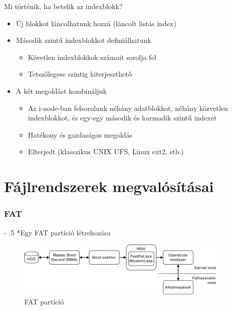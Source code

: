 \documentclass[tikz,12pt,margin=0px]{article}
\makeatletter
\renewcommand\paragraph{%
	\@startsection{paragraph}{4}{0mm}%
	{-\baselineskip}%
	{.5\baselineskip}%
	{\normalfont\normalsize\bfseries}}
\makeatother
\begin{document}
    \noindent Mi történik, ha betelik az indexblokk?
    \begin{itemize}[topsep=8pt,itemsep=4pt,partopsep=4pt, parsep=4pt]
      \item Új blokkot láncolhatunk hozzá (láncolt listás index)
      \item Második szintű indexblokkot definiálhatunk
      \begin{itemize}
        \item Követlen indexblokkok számait sorolja fel
        \item Tetszőlegese szintig kiterjeszthető
      \end{itemize}
      \item A két megoldást kombináljuk
      \begin{itemize}
        \item Az i-node-ban felsorolunk néhány adatblokkot, néhány közvetlen indexblokkot, és egy-egy második és harmadik szintű indexet
        \item Hatékony és gazdaságos megoldás
        \item Elterjedt (klasszikus UNIX UFS, Linux ext2, stb.)
      \end{itemize}
    \end{itemize}

     \section*{Fájlrendszerek megvalósításai}

	\subsubsection*{FAT}

    \paragraph*{Egy FAT partíció létrehozása}

	\begin{figure}[H]
		\centering
		\includegraphics[width=0.9\textwidth]{img/FAT_disk.png}
		\caption{FAT partíció}
        \label{fat_partition}
	\end{figure}
\end{document}
